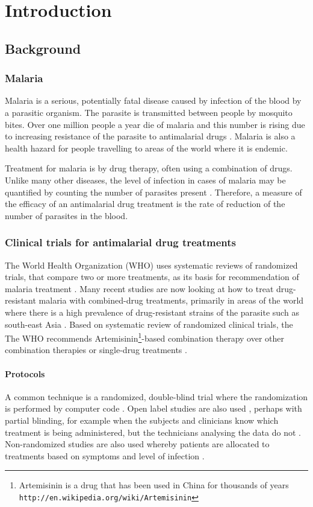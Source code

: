 \chapter{Introduction}\label{ch:intro}
\section{Background}
\subsection{Malaria}
Malaria is a serious, potentially fatal disease caused by infection of the blood by a parasitic organism. The parasite is transmitted between people by mosquito bites. Over one million people a year die of malaria and this number is rising due to increasing resistance of the parasite to antimalarial drugs \cite{who}. Malaria is also a health hazard for people travelling to areas of the world where it is endemic.

Treatment for malaria is by drug therapy, often using a combination of drugs. Unlike many other diseases, the level of infection in cases of malaria may be quantified by counting the number of parasites present \cite{white}. Therefore, a measure of the efficacy of an antimalarial drug treatment is the rate of reduction of the number of parasites in the blood. 

\subsection{Clinical trials for antimalarial drug treatments}
The World Health Organization (WHO) uses systematic reviews of randomized trials, that compare two or more treatments, as its basis for recommendation of malaria treatment \cite{who}. Many recent studies are now looking at how to treat drug-resistant malaria with combined-drug treatments, primarily in areas of the world where there is a high prevalence of drug-resistant strains of the parasite such as south-east Asia \cite{smithuis}. Based on systematic review of randomized clinical trials, the The WHO recommends Artemisinin\footnote{Artemisinin is a drug that has been used in China for thousands of years \texttt{http://en.wikipedia.org/wiki/Artemisinin}}-based combination therapy over other combination therapies or single-drug treatments \cite{who}. 

\subsubsection*{Protocols}
A common technique is a randomized, double-blind trial where the randomization is performed by computer code \cite{bell, newton, vries}. Open label studies are also used \cite{smithuis, wootton}, perhaps with partial blinding, for example when the subjects and clinicians know which treatment is being administered, but the technicians analysing the data do not \cite{wootton}. Non-randomized studies are also used whereby patients are allocated to treatments based on symptoms and level of infection \cite{carmello}.

